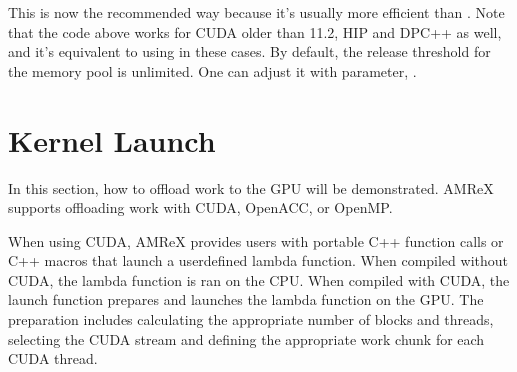 \documentclass[letterpaper,10pt,english]{sphinxmanual}
\begin{document}
\begin{sphinxVerbatim}[commandchars=\\\{\}]
     
      
     
      
   
    

\end{sphinxVerbatim}

\sphinxAtStartPar
This is now the recommended way because it’s usually more efficient than
.  Note that the code above works for CUDA older than 11.2, HIP
and DPC++ as well, and it’s equivalent to using  in these
cases.  By default, the release threshold for the memory pool is unlimited.
One can adjust it with  parameter,
.


\section{Kernel Launch}
\label{\detokenize{GPU:kernel-launch}}\label{\detokenize{GPU:sec-gpu-launch}}
\sphinxAtStartPar
In this section, how to offload work to the GPU will be demonstrated.
AMReX supports offloading work with CUDA, OpenACC, or OpenMP.

\sphinxAtStartPar
When using CUDA, AMReX provides users with portable C++ function calls or
C++ macros that launch a user\sphinxhyphen{}defined lambda function.  When compiled without CUDA,
the lambda function is ran on the CPU. When compiled with CUDA, the launch function
prepares and launches the lambda function on the GPU. The preparation includes
calculating the appropriate number of blocks and threads, selecting the CUDA stream
and defining the appropriate work chunk for each CUDA thread.
\end{document}
